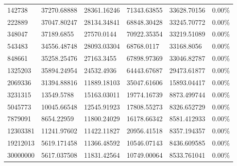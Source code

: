 \documentclass[12pt]{article} %
\begin{document}
\begin{table}[]
{\begin{tabular}{@{}llllll@{}}
142738 & 37270.68888 & 28361.16246 & 71343.63855 & 33628.70156 & 0.00\% \\
222889 & 37047.80247 & 28134.34841 & 68848.30428 & 33245.70772 & 0.00\% \\
348047 & 37189.6855 & 27570.0144 & 70922.35354 & 33219.51089 & 0.00\% \\
543483 & 34556.48748 & 28093.03304 & 68768.0117 & 33168.8056 & 0.00\% \\
848661 & 35258.25476 & 27163.3455 & 67898.97369 & 33046.82787 & 0.00\% \\
1325203 & 35894.24954 & 24532.4936 & 64443.67687 & 29473.61877 & 0.00\% \\
2069336 & 31394.88816 & 11889.18103 & 35047.61606 & 15893.04417 & 0.00\% \\
3231315 & 13549.5788 & 15163.03011 & 19774.16739 & 8873.499744 & 0.00\% \\
5045773 & 10045.66548 & 12545.91923 & 17808.55273 & 8326.652729 & 0.00\% \\
7879091 & 8654.22959 & 11800.24029 & 16178.66342 & 8581.412933 & 0.00\% \\
12303381 & 11241.97602 & 11422.11827 & 20956.41518 & 8357.194357 & 0.00\% \\
19212013 & 5619.171458 & 11366.48592 & 10546.07143 & 8436.609585 & 0.00\% \\
30000000 & 5617.037508 & 11831.42564 & 10749.00064 & 8533.761041 & 0.00\% \\ \bottomrule
\end{tabular}%
}
\end{table}
\end{document}
